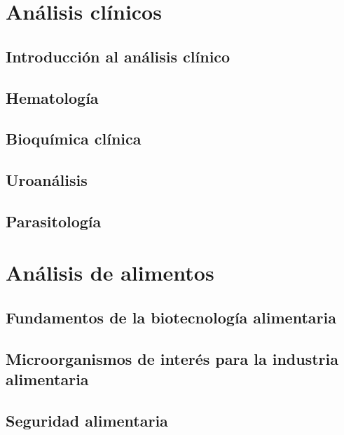 \documentclass{../summarie}
\begin{document}
\Portada
\Indice
\fancystyle
\onehalfspacing


\part{Análisis clínicos}

    \chapter{Introducción al análisis clínico}
    \chapter{Hematología}
        
        
    \chapter{Bioquímica clínica}
    \chapter{Uroanálisis}
    \chapter{Parasitología}

\part{Análisis de alimentos}

    \chapter{Fundamentos de la biotecnología alimentaria}
        
        
    \chapter{Microorganismos de interés para la industria alimentaria}
        
    
    \chapter{Seguridad alimentaria}
        
        
\end{document}
